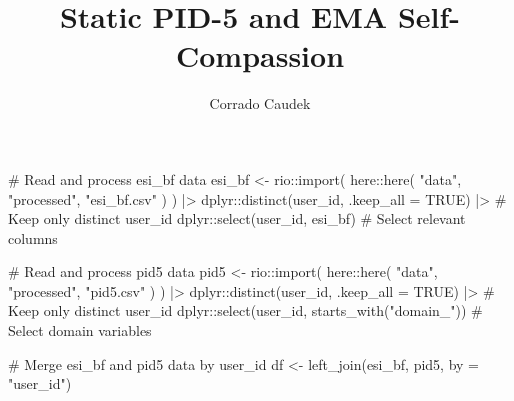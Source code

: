 \documentclass[
  11pt,
  a4paper,
  onecolumn]{article}
\title{Static PID-5 and EMA Self-Compassion}
\author{Corrado Caudek}
\date{}
\newenvironment{Shaded}{}{}
\newcommand{\AttributeTok}[1]{\textcolor[rgb]{0.84,0.23,0.29}{#1}}
\newcommand{\CommentTok}[1]{\textcolor[rgb]{0.42,0.45,0.49}{#1}}
\newcommand{\ConstantTok}[1]{\textcolor[rgb]{0.00,0.36,0.77}{#1}}
\newcommand{\FunctionTok}[1]{\textcolor[rgb]{0.44,0.26,0.76}{#1}}
\newcommand{\NormalTok}[1]{\textcolor[rgb]{0.14,0.16,0.18}{#1}}
\newcommand{\OtherTok}[1]{\textcolor[rgb]{0.44,0.26,0.76}{#1}}
\newcommand{\SpecialCharTok}[1]{\textcolor[rgb]{0.00,0.36,0.77}{#1}}
\newcommand{\StringTok}[1]{\textcolor[rgb]{0.01,0.18,0.38}{#1}}
\begin{document}
\maketitle


\begin{Shaded}
\begin{Highlighting}[]
\CommentTok{\# Read and process \textquotesingle{}esi\_bf\textquotesingle{} data}
\NormalTok{esi\_bf }\OtherTok{\textless{}{-}}\NormalTok{ rio}\SpecialCharTok{::}\FunctionTok{import}\NormalTok{(}
\NormalTok{  here}\SpecialCharTok{::}\FunctionTok{here}\NormalTok{(}
    \StringTok{"data"}\NormalTok{,}
    \StringTok{"processed"}\NormalTok{,}
    \StringTok{"esi\_bf.csv"}
\NormalTok{  )}
\NormalTok{) }\SpecialCharTok{|\textgreater{}}
\NormalTok{  dplyr}\SpecialCharTok{::}\FunctionTok{distinct}\NormalTok{(user\_id, }\AttributeTok{.keep\_all =} \ConstantTok{TRUE}\NormalTok{) }\SpecialCharTok{|\textgreater{}} \CommentTok{\# Keep only distinct user\_id}
\NormalTok{  dplyr}\SpecialCharTok{::}\FunctionTok{select}\NormalTok{(user\_id, esi\_bf) }\CommentTok{\# Select relevant columns}

\CommentTok{\# Read and process \textquotesingle{}pid5\textquotesingle{} data}
\NormalTok{pid5 }\OtherTok{\textless{}{-}}\NormalTok{ rio}\SpecialCharTok{::}\FunctionTok{import}\NormalTok{(}
\NormalTok{  here}\SpecialCharTok{::}\FunctionTok{here}\NormalTok{(}
    \StringTok{"data"}\NormalTok{,}
    \StringTok{"processed"}\NormalTok{,}
    \StringTok{"pid5.csv"}
\NormalTok{  )}
\NormalTok{) }\SpecialCharTok{|\textgreater{}}
\NormalTok{  dplyr}\SpecialCharTok{::}\FunctionTok{distinct}\NormalTok{(user\_id, }\AttributeTok{.keep\_all =} \ConstantTok{TRUE}\NormalTok{) }\SpecialCharTok{|\textgreater{}}  \CommentTok{\# Keep only distinct user\_id}
\NormalTok{  dplyr}\SpecialCharTok{::}\FunctionTok{select}\NormalTok{(user\_id, }\FunctionTok{starts\_with}\NormalTok{(}\StringTok{"domain\_"}\NormalTok{)) }\CommentTok{\# Select domain variables}

\CommentTok{\# Merge \textquotesingle{}esi\_bf\textquotesingle{} and \textquotesingle{}pid5\textquotesingle{} data by user\_id}
\NormalTok{df }\OtherTok{\textless{}{-}} \FunctionTok{left\_join}\NormalTok{(esi\_bf, pid5, }\AttributeTok{by =} \StringTok{"user\_id"}\NormalTok{)}
\end{Highlighting}
\end{Shaded}
\end{document}
